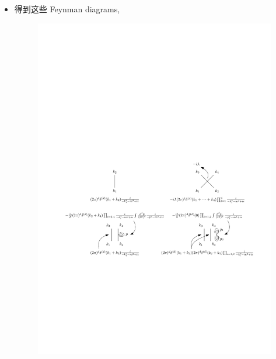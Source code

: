\begin{itemize}
	\item 得到这些 Feynman diagrams,
	
	\begin{figure}[H]
		\centering
		\includegraphics[scale=1]{figures/collision between particles - Feynman diagrams (in momentum space).pdf}
	\end{figure}
	

\end{itemize}
